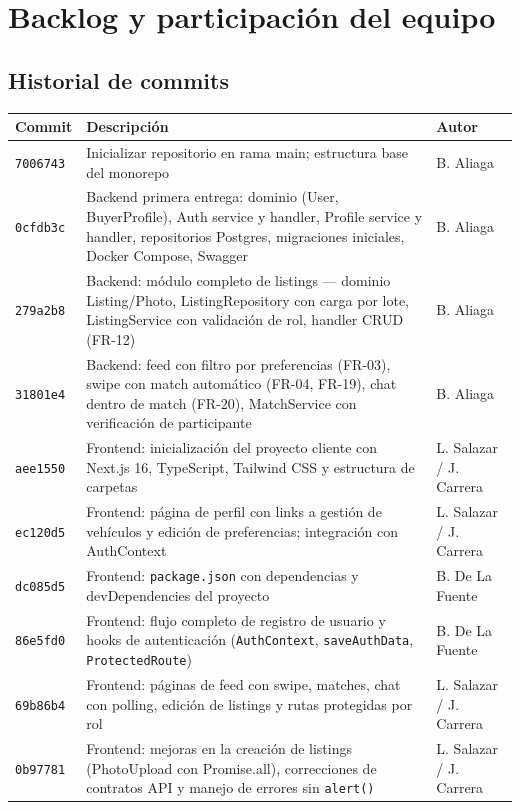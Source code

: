 \documentclass[12pt,a4paper]{article}
\begin{document}
\section{Backlog y participación del equipo}

\subsection{Historial de commits}

\begin{longtable}{lp{7.5cm}l}
  \toprule
  \textbf{Commit} & \textbf{Descripción} & \textbf{Autor} \\
  \midrule
  \endhead
  \texttt{7006743}
    & Inicializar repositorio en rama main; estructura base del monorepo
    & B. Aliaga \\[3pt]
  \texttt{0cfdb3c}
    & Backend primera entrega: dominio (User, BuyerProfile), Auth service y handler,
      Profile service y handler, repositorios Postgres, migraciones iniciales, Docker
      Compose, Swagger
    & B. Aliaga \\[3pt]
  \texttt{279a2b8}
    & Backend: módulo completo de listings --- dominio Listing/Photo, ListingRepository
      con carga por lote, ListingService con validación de rol, handler CRUD (FR-12)
    & B. Aliaga \\[3pt]
  \texttt{31801e4}
    & Backend: feed con filtro por preferencias (FR-03), swipe con match automático
      (FR-04, FR-19), chat dentro de match (FR-20), MatchService con verificación de
      participante
    & B. Aliaga \\[3pt]
  \texttt{aee1550}
    & Frontend: inicialización del proyecto cliente con Next.js 16, TypeScript,
      Tailwind CSS y estructura de carpetas
    & L. Salazar / J. Carrera \\[3pt]
  \texttt{ec120d5}
    & Frontend: página de perfil con links a gestión de vehículos y edición de
      preferencias; integración con AuthContext
    & L. Salazar / J. Carrera \\[3pt]
  \texttt{dc085d5}
    & Frontend: \texttt{package.json} con dependencias y devDependencies del proyecto
    & B. De La Fuente \\[3pt]
  \texttt{86e5fd0}
    & Frontend: flujo completo de registro de usuario y hooks de autenticación
      (\texttt{AuthContext}, \texttt{saveAuthData}, \texttt{ProtectedRoute})
    & B. De La Fuente \\[3pt]
  \texttt{69b86b4}
    & Frontend: páginas de feed con swipe, matches, chat con polling, edición de
      listings y rutas protegidas por rol
    & L. Salazar / J. Carrera \\[3pt]
  \texttt{0b97781}
    & Frontend: mejoras en la creación de listings (PhotoUpload con Promise.all),
      correcciones de contratos API y manejo de errores sin \texttt{alert()}
    & L. Salazar / J. Carrera \\
  \bottomrule
\end{longtable}
\end{document}
